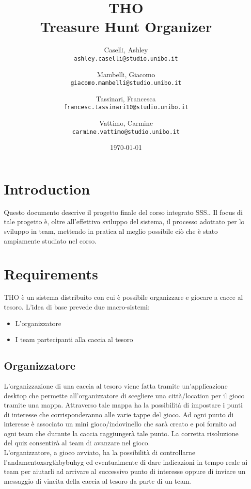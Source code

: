 \documentclass[10pt, english]{article}
\title{\textbf{THO\\Treasure Hunt Organizer}}
\author{
	Caselli, Ashley\\
	\texttt{ashley.caselli@studio.unibo.it}
	\and
	Mambelli, Giacomo\\
	\texttt{giacomo.mambelli@studio.unibo.it}
	\and
	Tassinari, Francesca\\
	\texttt{francesc.tassinari10@studio.unibo.it}
	\and
	Vattimo, Carmine\\
	\texttt{carmine.vattimo@studio.unibo.it}
}
\date{\today}
\begin{document}
\maketitle
\newpage
\tableofcontents
\newpage

\section{Introduction}
Questo documento descrive il progetto finale del corso integrato SSS.. Il focus di tale progetto è, oltre all'effettivo sviluppo del sistema, il processo adottato per lo sviluppo in team, mettendo in pratica al meglio possibile ciò che è stato ampiamente studiato nel corso.


\section{Requirements}
THO è un sistema distribuito con cui è possibile organizzare e giocare a cacce al tesoro.
L’idea di base prevede due macro-sistemi:\\
\begin{itemize}
	\item L'organizzatore
	\item I team partecipanti alla caccia al tesoro
\end{itemize}
\subsection*{Organizzatore}
L’organizzazione di una caccia al tesoro viene fatta tramite un’applicazione desktop che permette all'organizzatore di scegliere una città/location per il gioco tramite una mappa. Attraverso tale mappa ha la possibilità di impostare i punti di interesse che corrisponderanno alle varie tappe del gioco. Ad ogni punto di interesse è associato un mini gioco/indovinello che sarà creato e poi fornito ad ogni team che durante la caccia raggiungerà tale punto. La corretta risoluzione del quiz consentirà al team di avanzare nel gioco.\\
L'organizzatore, a gioco avviato, ha la possibilità di controllarne l'andamentoxsrgthbybuhyg ed eventualmente di dare indicazioni in tempo reale ai team per aiutarli ad arrivare al successivo punto di interesse oppure di inviare un messaggio di vincita della caccia al tesoro da parte di un team.
\end{document}
